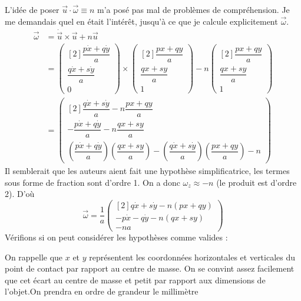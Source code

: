 \documentclass[12pt,a4paper]{article}
\begin{document}
L'idée de poser $\vec{u}\cdot\vec{\omega}\equiv n$ m'a posé pas mal de problèmes de compréhension. Je me demandais quel en était l'intérêt, jusqu'à ce que je calcule explicitement $\vec{\omega}$.\\
\bgroup
\addtolength{\jot}{5pt}
\begin{align*}
\vec{\omega}	&=	\dot{\vec{u}}\times\vec{u}+n\vec{u}\\
				&=\begin{pmatrix}[2]\dfrac{p\dot{x}+q\dot{y}}{a}\\\dfrac{q\dot{x}+s\dot{y}}{a}\\0\end{pmatrix}	\times	\begin{pmatrix}[2]\dfrac{px+qy}{a}\\\dfrac{qx+sy}{a}\\1\end{pmatrix}	-n\begin{pmatrix}[2]\dfrac{px+qy}{a}\\\dfrac{qx+sy}{a}\\1\end{pmatrix}\\
				&=\begin{pmatrix}[2]
				\dfrac{q\dot{x}+s\dot{y}}{a}-n\dfrac{px+qy}{a}\\
				-\dfrac{p\dot{x}+q\dot{y}}{a}-n\dfrac{qx+sy}{a}\\
				\left(\dfrac{p\dot{x}+q\dot{y}}{a}\right)  \left(\dfrac{qx+sy}{a}\right)  - \left(\dfrac{q\dot{x}+s\dot{y}}{a}\right)  \left( \dfrac{px+qy}{a}\right)  - n
				\end{pmatrix}
\end{align*}
Il semblerait que les auteurs aient fait une hypothèse simplificatrice, les termes sous forme de fraction sont d'ordre 1. On a donc $\omega_z\approx-n$ (le produit est d'ordre 2). D'où
\begin{equation}
\vec{\omega}=\dfrac{1}{a}\begin{pmatrix}[2]
	q\dot{x}+s\dot{y}-n(px+qy)\\
	-p\dot{x}-q\dot{y}-n(qx+sy)\\
	- na
	\end{pmatrix}
\end{equation}
\egroup
Vérifions si on peut considérer les hypothèses comme valides :


On rappelle que $x$ et $y$ représentent les coordonnées horizontales et verticales du point de contact par rapport au centre de masse. On se convint assez facilement que cet écart au centre de masse et petit par rapport aux dimensions de l'objet.On prendra en ordre de grandeur le millimètre
\end{document}
